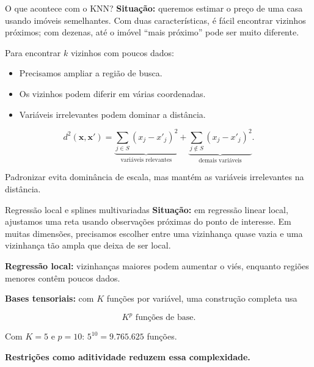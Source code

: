 \documentclass[
  10pt,
  ignorenonframetext,
  aspectratio=169,
  brazilian,
]{beamer}
\providecommand{\tightlist}{%
  \setlength{\itemsep}{0pt}\setlength{\parskip}{0pt}}
\begin{document}
\begin{frame}{O que acontece com o KNN?}
\protect{}\label{o-que-acontece-com-o-knn}
\textbf{Situação:} queremos estimar o preço de uma casa usando imóveis
semelhantes. Com duas características, é fácil encontrar vizinhos
próximos; com dezenas, até o imóvel ``mais próximo'' pode ser muito
diferente.

Para encontrar \(k\) vizinhos com poucos dados:

\begin{itemize}
\tightlist
\item
  Precisamos ampliar a região de busca.
\item
  Os vizinhos podem diferir em várias coordenadas.
\item
  Variáveis irrelevantes podem dominar a distância.
\end{itemize}

\[
d^2(\mathbf x,\mathbf x')=
\underbrace{\sum_{j\in S}(x_j-x'_j)^2}_{\text{variáveis relevantes}}
+
\underbrace{\sum_{j\notin S}(x_j-x'_j)^2}_{\text{demais variáveis}}.
\]

Padronizar evita dominância de escala, mas mantém as variáveis
irrelevantes na distância.
\end{frame}

\begin{frame}{Regressão local e splines multivariadas}
\protect{}\label{regressuxe3o-local-e-splines-multivariadas}
\textbf{Situação:} em regressão linear local, ajustamos uma reta usando
observações próximas do ponto de interesse. Em muitas dimensões,
precisamos escolher entre uma vizinhança quase vazia e uma vizinhança
tão ampla que deixa de ser local.

\textbf{Regressão local:} vizinhanças maiores podem aumentar o viés,
enquanto regiões menores contêm poucos dados.

\textbf{Bases tensoriais:} com \(K\) funções por variável, uma
construção completa usa

\[
\boxed{K^p\text{ funções de base}.}
\]

Com \(K=5\) e \(p=10\): \(5^{10}=9.765.625\) funções.

\textbf{Restrições como aditividade reduzem essa complexidade.}
\end{frame}
\end{document}

